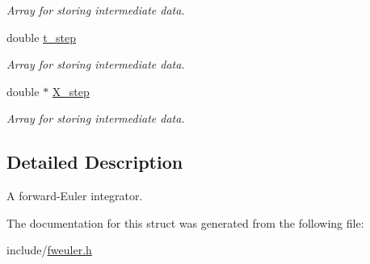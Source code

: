 \begin{DoxyCompactItemize}
\begin{DoxyCompactList}\small\item\em Array for storing intermediate data. \end{DoxyCompactList}\item 
\hypertarget{structfweuler_a34810f998eae03fbeaa53d37b73ec366}{double \hyperlink{structfweuler_a34810f998eae03fbeaa53d37b73ec366}{t\-\_\-step}}\label{structfweuler_a34810f998eae03fbeaa53d37b73ec366}

\begin{DoxyCompactList}\small\item\em Array for storing intermediate data. \end{DoxyCompactList}\item 
\hypertarget{structfweuler_aceb1a0fdb7cb920512268ff3031b70dd}{double $\ast$ \hyperlink{structfweuler_aceb1a0fdb7cb920512268ff3031b70dd}{X\-\_\-step}}\label{structfweuler_aceb1a0fdb7cb920512268ff3031b70dd}

\begin{DoxyCompactList}\small\item\em Array for storing intermediate data. \end{DoxyCompactList}\end{DoxyCompactItemize}


\subsection{Detailed Description}
A forward-\/\-Euler integrator. 

The documentation for this struct was generated from the following file\-:\begin{DoxyCompactItemize}
\item 
include/\hyperlink{fweuler_8h}{fweuler.\-h}\end{DoxyCompactItemize}
